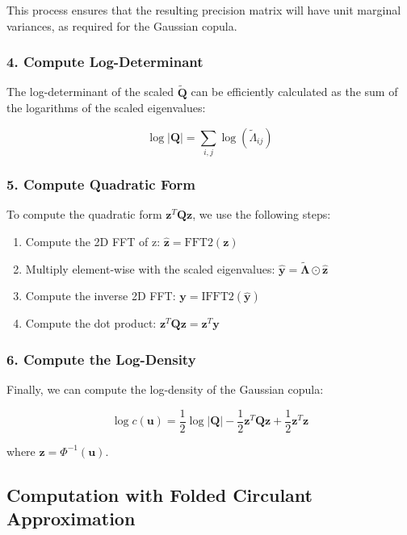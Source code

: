 \documentclass[journal=,manuscript=]{achemso}
\providecommand{\tightlist}{%
  \setlength{\itemsep}{0pt}\setlength{\parskip}{0pt}}\usepackage{longtable,booktabs,array}
\begin{document}
This process ensures that the resulting precision matrix will have unit
marginal variances, as required for the Gaussian copula.

\subsubsection{4. Compute
Log-Determinant}\label{compute-log-determinant}

The log-determinant of the scaled \(\mathbf{\widetilde Q}\) can be
efficiently calculated as the sum of the logarithms of the scaled
eigenvalues:

\[
\log|\mathbf{Q}| = \sum_{i,j} \log(\widetilde \Lambda_{ij})
\]

\subsubsection{5. Compute Quadratic Form}\label{compute-quadratic-form}

To compute the quadratic form \(\mathbf{z}^T\mathbf{Q}\mathbf{z}\), we
use the following steps:

\begin{enumerate}
\def\labelenumi{\alph{enumi}.}
\tightlist
\item
  Compute the 2D FFT of z:
  \(\mathbf{\hat{z}} = \text{FFT2}(\mathbf{z})\)
\item
  Multiply element-wise with the scaled eigenvalues:
  \(\mathbf{\hat{y}} = \boldsymbol{\widetilde \Lambda} \odot \mathbf{\hat{z}}\)
\item
  Compute the inverse 2D FFT:
  \(\mathbf{y} = \text{IFFT2}(\mathbf{\hat{y}})\)
\item
  Compute the dot product:
  \(\mathbf{z}^T\mathbf{Q}\mathbf{z} = \mathbf{z}^T\mathbf{y}\)
\end{enumerate}

\subsubsection{6. Compute the
Log-Density}\label{compute-the-log-density}

Finally, we can compute the log-density of the Gaussian copula:

\[
\log c(\mathbf{u}) = \frac{1}{2}\log|\mathbf{Q}| - \frac{1}{2}\mathbf{z}^T\mathbf{Q}\mathbf{z} + \frac{1}{2}\mathbf{z}^T\mathbf{z}
\]

where \(\mathbf{z} = \Phi^{-1}(\mathbf{u})\).

\subsection{Computation with Folded Circulant
Approximation}\label{computation-with-folded-circulant-approximation}
\end{document}
